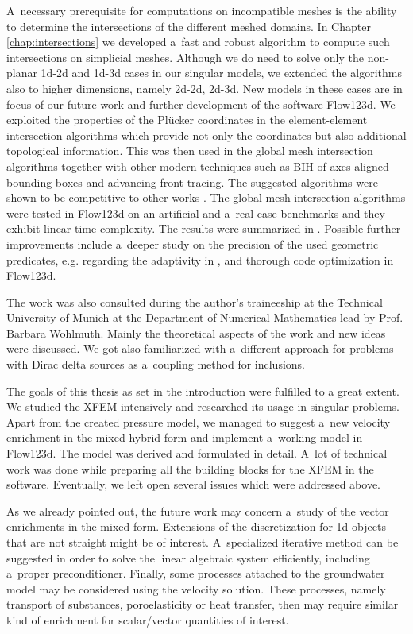 \documentclass[bibliography=totocnumbered,dvipsnames,FM,Dis,EN]{tulthesis}
\newcommand{\plucker}{Pl\"{u}cker }
\begin{document}
A~necessary prerequisite for computations on incompatible meshes is the ability to determine
the intersections of the different meshed domains. In Chapter \ref{chap:intersections} we developed
a~fast and robust algorithm to compute such intersections on simplicial meshes.
Although we do need to solve only the non-planar 1d-2d and 1d-3d cases in our singular models,
we extended the algorithms also to higher dimensions, namely 2d-2d, 2d-3d.
New models in these cases are in focus of our future work and further development of the software Flow123d.
We exploited the properties of the \plucker coordinates \cite{platis_fast_2003, joswig_plucker_2013}
in the element-element intersection algorithms which provide not only the coordinates but also additional topological information.
This was then used in the global mesh intersection algorithms together with other modern techniques
such as BIH of axes aligned bounding boxes and advancing front tracing.
The suggested algorithms were shown to be competitive to other works \cite{moller_fast_1997, haines_fast_1991}.
The global mesh intersection algorithms were tested in Flow123d on an artificial and a~real case benchmarks
and they exhibit linear time complexity. The results were summarized in \cite{brezina_2017}.
Possible further improvements include a~deeper study on the precision of the used geometric predicates,
e.g. regarding the adaptivity in \cite{shewchuk_adaptive_1997}, and thorough code optimization in Flow123d.


The work was also consulted during the author's traineeship at the Technical University of Munich at the Department of Numerical Mathematics
lead by Prof. Barbara Wohlmuth. Mainly the theoretical aspects of the work and new ideas were discussed.
We got also familiarized with a~different approach for problems with Dirac delta sources \cite{koppl_tum_2015, koppl_vidotto_2018}
as a~coupling method for inclusions.


The goals of this thesis as set in the introduction were fulfilled to a great extent.
We studied the XFEM intensively and researched its usage in singular problems.
Apart from the created pressure model, we managed to suggest a~new velocity enrichment in the mixed-hybrid form
and implement a~working model in Flow123d. The model was derived and formulated in detail.
A~lot of technical work was done while preparing all the building blocks for the XFEM in the software.
Eventually, we left open several issues which were addressed above.

As we already pointed out, the future work may concern a~study of the vector enrichments in the mixed form.
Extensions of the discretization for 1d objects that are not straight might be of interest.
A~specialized iterative method can be suggested in order to solve the linear algebraic system efficiently,
including a~proper preconditioner.
Finally, some processes attached to the groundwater model may be considered using the velocity solution.
These processes, namely transport of substances, poroelasticity or heat transfer, then may require
similar kind of enrichment for scalar/vector quantities of interest. 
\end{document}
